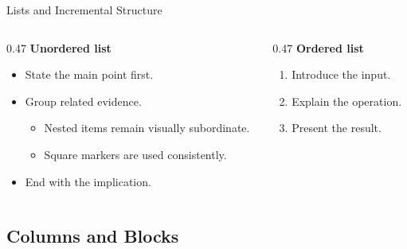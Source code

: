 \documentclass[10pt,aspectratio=169]{virgiling-slides}
\begin{document}
\begin{frame}{Lists and Incremental Structure}
  \begin{columns}[T,onlytextwidth]
    \begin{column}{0.47\textwidth}
      \textbf{Unordered list}
      \begin{itemize}
        \item State the main point first.
        \item Group related evidence.
          \begin{itemize}
            \item Nested items remain visually subordinate.
            \item Square markers are used consistently.
          \end{itemize}
        \item End with the implication.
      \end{itemize}
    \end{column}
    \begin{column}{0.47\textwidth}
      \textbf{Ordered list}
      \begin{enumerate}
        \item Introduce the input.
        \item Explain the operation.
        \item Present the result.
      \end{enumerate}
    \end{column}
  \end{columns}
\end{frame}

\subsection{Columns and Blocks}
\end{document}
